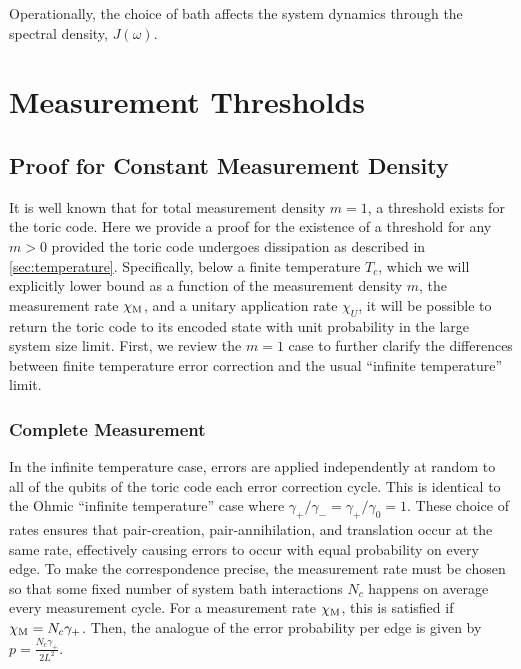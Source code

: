 \documentclass[twocolumn,superscriptaddress,aps,prb,floatfix]{revtex4-1}
\begin{document}
 Operationally, the choice of bath affects the system dynamics through the spectral density, $J(\omega)$. 


\section{Measurement Thresholds}
\label{sec:measurement_threshold}

\subsection{Proof for Constant Measurement Density}

 It is well known that for total measurement density $m=1$, a threshold exists for the toric code.  Here we provide a proof for the existence of a threshold for any $m>0$ provided the toric code undergoes dissipation as described in \ref{sec:temperature}.  Specifically, below a finite temperature $T_c$, which we will explicitly lower bound as a function of the measurement density $m$, the measurement rate $\chi_{\rm{M}}$, and a unitary application rate $\chi_{U}$, it will be possible to return the toric code to its encoded state with unit probability in the large system size limit.  First, we review the $m=1$ case to further clarify the differences between finite temperature error correction and the usual ``infinite temperature'' limit.
 
 \subsubsection{Complete Measurement}
 
  In the infinite temperature case, errors are applied independently at random to all of the qubits of the toric code each error correction cycle.  This is identical to the Ohmic ``infinite temperature'' case where $\gamma_+ / \gamma_- = \gamma_+ / \gamma_0 = 1$.  These choice of rates ensures that pair-creation, pair-annihilation, and translation occur at the same rate, effectively causing errors to occur with equal probability on every edge.  To make the correspondence precise, the measurement rate must be chosen so that some fixed number of system bath interactions $N_c$ happens on average every measurement cycle.  For a measurement rate $\chi_{\rm{M}}$, this is satisfied if $\chi_{\rm{M}} = N_c \gamma_+$.  Then, the analogue of the error probability per edge is given by $p = \frac{N_c \gamma_+}{2L^2}$.
 
\end{document}

